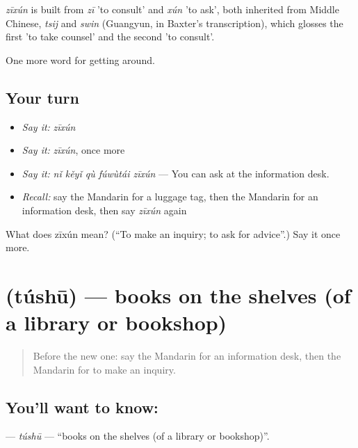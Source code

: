 \begin{cousinweb}
\emph{zīxún} is built from \emph{zī} 'to consult' and \emph{xún} 'to ask', both inherited from Middle Chinese, \emph{tsij} and \emph{swin} (Guangyun, in Baxter's transcription), which glosses the first 'to take counsel' and the second 'to consult'.
\end{cousinweb}

\begin{grammarlens}[title={What you've built}]
One more word for getting around.
\end{grammarlens}

\subsection*{Your turn}
\begin{itemize}
\raggedright
  \item \emph{Say it:} \emph{zīxún}
  \item \emph{Say it:} \emph{zīxún}, once more
  \item \emph{Say it:} \emph{nǐ kěyǐ qù fúwùtái zīxún} — You can ask at the information desk.
  \item \emph{Recall:} say the Mandarin for a luggage tag, then the Mandarin for an information desk, then say \emph{zīxún} again
\end{itemize}

\begin{tcolorbox}[breakable,colback=teal!4,colframe=teal!35!black,title={Before you move on}]
What does zīxún mean? (\textquotedblleft{}To make an inquiry; to ask for advice\textquotedblright{}.) Say it once more.
\end{tcolorbox}
\section[\texorpdfstring{\zh{图书} (túshū)}{图书 (túshū)}]{ (túshū) — books on the shelves (of a library or bookshop)}

\label{lesson:ZH-C454-tushu}



\begin{quote}
Before the new one: say the Mandarin for an information desk, then the Mandarin for to make an inquiry.
\end{quote}

\subsection*{You'll want to know: }
\textbf{} — \emph{túshū} — \textquotedblleft{}books on the shelves (of a library or bookshop)\textquotedblright{}.

